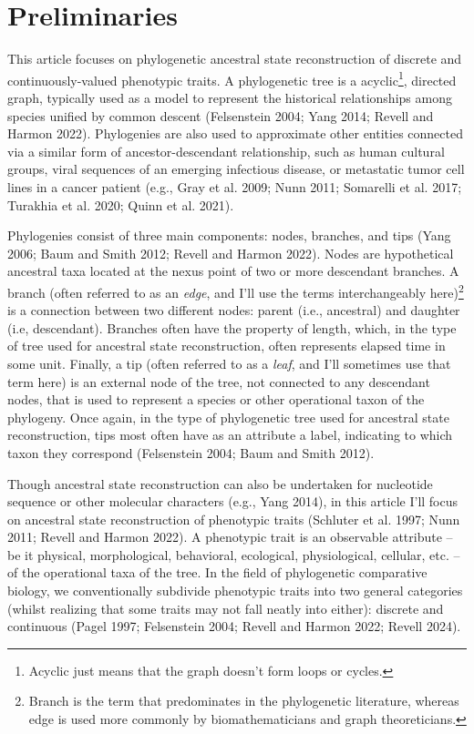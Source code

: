 \documentclass{article}
\begin{document}
\section{Preliminaries}\label{preliminaries}

This article focuses on phylogenetic ancestral state reconstruction of discrete and continuously-valued phenotypic traits. A phylogenetic tree is a acyclic\footnote{Acyclic just means that the graph doesn't form loops or cycles.}, directed graph, typically used as a model to represent the historical relationships among species unified by common descent (Felsenstein 2004; Yang 2014; Revell and Harmon 2022). Phylogenies are also used to approximate other entities connected via a similar form of ancestor-descendant relationship, such as human cultural groups, viral sequences of an emerging infectious disease, or metastatic tumor cell lines in a cancer patient (e.g., Gray et al. 2009; Nunn 2011; Somarelli et al. 2017; Turakhia et al. 2020; Quinn et al. 2021).

Phylogenies consist of three main components: nodes, branches, and tips (Yang 2006; Baum and Smith 2012; Revell and Harmon 2022). Nodes are hypothetical ancestral taxa located at the nexus point of two or more descendant branches. A branch (often referred to as an \emph{edge}, and I'll use the terms interchangeably here)\footnote{Branch is the term that predominates in the phylogenetic literature, whereas edge is used more commonly by biomathematicians and graph theoreticians.} is a connection between two different nodes: parent (i.e., ancestral) and daughter (i.e, descendant). Branches often have the property of length, which, in the type of tree used for ancestral state reconstruction, often represents elapsed time in some unit. Finally, a tip (often referred to as a \emph{leaf}, and I'll sometimes use that term here) is an external node of the tree, not connected to any descendant nodes, that is used to represent a species or other operational taxon of the phylogeny. Once again, in the type of phylogenetic tree used for ancestral state reconstruction, tips most often have as an attribute a label, indicating to which taxon they correspond (Felsenstein 2004; Baum and Smith 2012).

Though ancestral state reconstruction can also be undertaken for nucleotide sequence or other molecular characters (e.g., Yang 2014), in this article I'll focus on ancestral state reconstruction of phenotypic traits (Schluter et al. 1997; Nunn 2011; Revell and Harmon 2022). A phenotypic trait is an observable attribute -- be it physical, morphological, behavioral, ecological, physiological, cellular, etc. -- of the operational taxa of the tree. In the field of phylogenetic comparative biology, we conventionally subdivide phenotypic traits into two general categories (whilst realizing that some traits may not fall neatly into either): discrete and continuous (Pagel 1997; Felsenstein 2004; Revell and Harmon 2022; Revell 2024).
\end{document}
